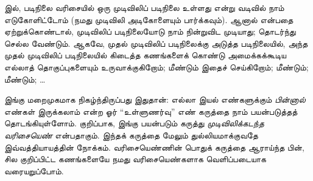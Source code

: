 \documentclass[../../../include/open-logic-section]{subfiles}
\begin{document}


 இல், படிநிலை வரிசையில் ஒரு முடிவிலிப் படிநிலை உள்ளது
என்று \stagesinf{} வடிவில் நாம் எடுகோளிட்டோம் (நமது முடிவிலி அடிகோளையும்
பார்க்கவும்). ஆனால் \stagessucc{} என்பதை ஏற்றுக்கொண்டால், முடிவிலிப்
படிநிலையோடு நாம் நின்றுவிட முடியாது; தொடர்ந்து செல்ல வேண்டும். ஆகவே,
முதல் முடிவிலிப் படிநிலைக்கு அடுத்த படிநிலையில், அந்த முதல் முடிவிலிப்
படிநிலையில் கிடைத்த கணங்களைக் கொண்டு அமைக்கக்கூடிய எல்லாத் தொகுப்புகளையும்
உருவாக்குகிறோம்; மீண்டும் இதைச் செய்கிறோம்; மீண்டும்; மீண்டும்; \dots

இங்கு மறைமுகமாக நிகழ்ந்திருப்பது இதுதான்: எல்லா இயல் எண்களுக்கும்
\emph{பின்னால்} எண்கள் இருக்கலாம் என்ற ஓர் ``உள்ளுணர்வு'' எண் கருத்தை நாம்
பயன்படுத்தத் தொடங்கியுள்ளோம். குறிப்பாக, இங்கு பயன்படும் கருத்து
\emph{முடிவிலிக்கடந்த வரிசையெண்} என்பதாகும். இந்தக் கருத்தை மேலும்
துல்லியமாக்குவதே இவ்வத்தியாயத்தின் நோக்கம். வரிசையெண்ணின் பொதுக் கருத்தை
ஆராய்ந்த பின், சில குறிப்பிட்ட கணங்களையே நமது வரிசையெண்களாக வெளிப்படையாக
வரையறுப்போம்.
\end{document}
